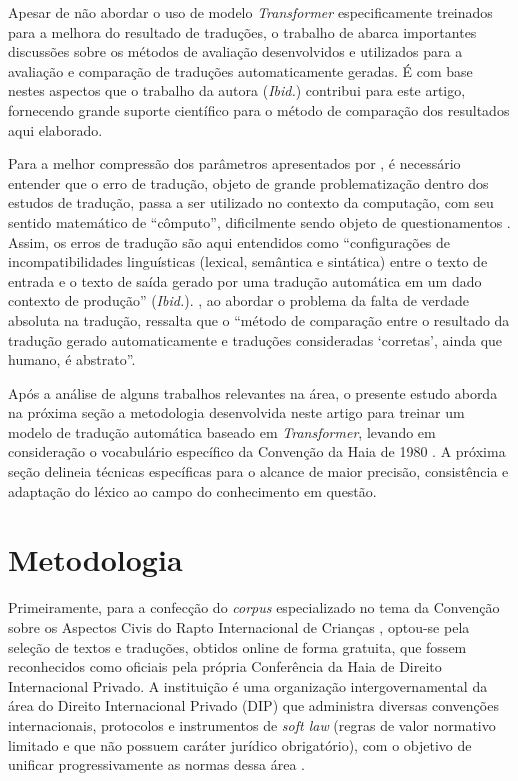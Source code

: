 \documentclass[portuguese]{textolivre}
\begin{document}
Apesar de não abordar o uso de modelo \textit{Transformer} especificamente treinados para a melhora do resultado de traduções, o trabalho de \textcite{banitz_machine_2020} abarca importantes discussões sobre os métodos de avaliação desenvolvidos e utilizados para a avaliação e comparação de traduções automaticamente geradas. É com base nestes aspectos que o trabalho da autora (\textit{Ibid.}) contribui para este artigo, fornecendo grande suporte científico para o método de comparação dos resultados aqui elaborado.

Para a melhor compressão dos parâmetros apresentados por \textcite{banitz_machine_2020}, é necessário entender que o erro de tradução, objeto de grande problematização dentro dos estudos de tradução, passa a ser utilizado no contexto da computação, com seu sentido matemático de “cômputo”, dificilmente sendo objeto de questionamentos \cite{pires_ampliando_2017}. Assim, os erros de tradução são aqui entendidos como “configurações de incompatibilidades linguísticas (lexical, semântica e sintática) entre o texto de entrada e o texto de saída gerado por uma tradução automática em um dado contexto de produção” (\textit{Ibid.}). \textcite[p. 242]{white_how_2003}, ao abordar o problema da falta de verdade absoluta na tradução, ressalta que o “método de comparação entre o resultado da tradução gerado automaticamente e traduções consideradas ‘corretas’, ainda que humano, é abstrato”.

Após a análise de alguns trabalhos relevantes na área, o presente estudo aborda na próxima seção a metodologia desenvolvida neste artigo para treinar um modelo de tradução automática baseado em \textit{Transformer}, levando em consideração o vocabulário específico da Convenção da Haia de 1980 \cite{hcch_convention_1980}. A próxima seção delineia técnicas específicas para o alcance de maior precisão, consistência e adaptação do léxico ao campo do conhecimento em questão.


\section{Metodologia}\label{sec-conduta}
Primeiramente, para a confecção do \textit{corpus} especializado no tema da Convenção sobre os Aspectos Civis do Rapto Internacional de Crianças \cite{hcch_convention_1980}, optou-se pela seleção de textos e traduções, obtidos online de forma gratuita, que fossem reconhecidos como oficiais pela própria Conferência da Haia de Direito Internacional Privado. A instituição é uma organização intergovernamental da área do Direito Internacional Privado (DIP) que administra diversas convenções internacionais, protocolos e instrumentos de \textit{soft law} (regras de valor normativo limitado e que não possuem caráter jurídico obrigatório), com o objetivo de unificar progressivamente as normas dessa área \cite{rodas_2007}.
\end{document}
